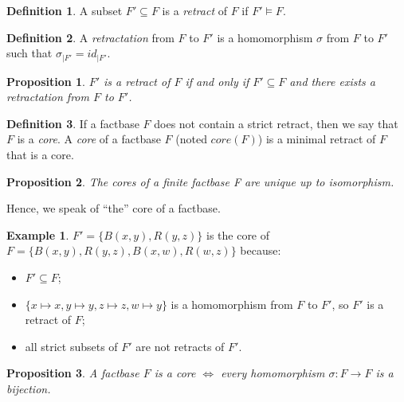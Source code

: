 \documentclass{article}
\newtheorem{proposition}{Proposition}[section]
\theoremstyle{definition}
\newtheorem{definition}{Definition}[section]
\newtheorem{example}{Example}[section]
\theoremstyle{remark}
\begin{document}
\begin{definition}
A subset $F' \subseteq F$ is a \emph{retract} of $F$ if $F' \models F$.
\end{definition}

\begin{definition}
A \emph{retractation} from $F$ to $F'$ is a homomorphism $\sigma$ from $F$ to $F'$ such that $\sigma_{|F'}=id_{|F'}$.
\end{definition}

\begin{proposition}
$F'$ is a retract of $F$ if and only if $F' \subseteq F$  and there exists a retractation from $F$ to $F'$.
\end{proposition}

\begin{definition}
If a factbase $F$ does not contain a strict retract, then we say that $F$ is a \emph{core}. A \emph{core} of a factbase $F$ (noted \emph{$\textit{core}(F)$}) is a minimal retract of $F$ that is a core.
\end{definition}

\begin{proposition}
The cores of a finite factbase F are unique up to isomorphism.
\end{proposition}

Hence, we speak of ``the'' core of a factbase.

\begin{example}
$F' = \{B(x,y),R(y,z)\}$ is the core of $F = \{B(x,y),R(y,z),B(x,w),R(w,z)\}$ because:
\begin{itemize}
\item $F' \subseteq F$;
\item $\{x \mapsto x, y \mapsto y, z \mapsto z, w \mapsto y\}$ is a homomorphism from $F$ to $F'$, so $F'$ is a retract of $F$;
\item all strict subsets of $F'$ are not retracts of $F'$.
\end{itemize}
\end{example}

\begin{proposition}
A factbase $F$ is a core $\Leftrightarrow$ every homomorphism $\sigma: F \to F$ is a bijection.
\end{proposition}
\end{document}
